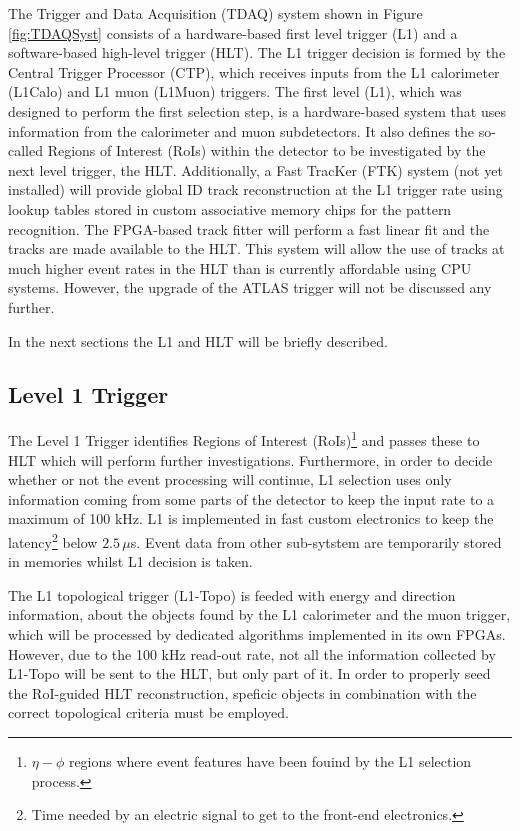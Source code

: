 		The Trigger and Data Acquisition (TDAQ) system shown in Figure \ref{fig:TDAQSyst} consists of a hardware-based first level trigger (L1) and a software-based high-level trigger (HLT). The L1 trigger decision is formed by the Central Trigger Processor (CTP), which receives inputs from the L1 calorimeter (L1Calo) and L1 muon (L1Muon) triggers. The first level (L1), which was designed to perform the first selection step, is a hardware-based system that uses information from the calorimeter and muon subdetectors. It also defines the so-called Regions of Interest (RoIs) within the detector to be investigated by the next level trigger, the HLT. Additionally, a Fast TracKer (FTK) system \cite{FTKTDR} (not yet installed) will provide global ID track reconstruction at the L1 trigger rate using lookup tables stored in custom associative memory chips for the pattern recognition. The FPGA-based track fitter will perform a fast linear fit and the tracks are made available to the HLT. This system will allow the use of tracks at much higher event rates in the HLT than is currently affordable using CPU systems. However, the upgrade of the ATLAS trigger will not be discussed any further.

		In the next sections the L1 and HLT will be briefly described. 


		\subsection{Level 1 Trigger}

			The Level 1 Trigger identifies Regions of Interest (RoIs)\footnote{$\eta - \phi$ regions where event features have been fouind by the L1 selection process.} and passes these to HLT which will perform further investigations. Furthermore, in order to decide whether or not the event processing will continue, L1 selection uses only information coming from some parts of the detector to keep the input rate to a maximum of 100 kHz. L1 is implemented in fast custom electronics to keep the latency\footnote{Time needed by an electric signal to get to the front-end electronics.} below $2.5\, \mu$s. Event data from other sub-sytstem are temporarily stored in memories whilst L1 decision is taken. 

			The L1 topological trigger (L1-Topo) \cite{ATLASL1Topo} is feeded with energy and direction information, about the objects found by the L1 calorimeter and the muon trigger, which will be processed by dedicated algorithms implemented in its own FPGAs. However, due to the 100 kHz read-out rate, not all the information collected by L1-Topo will be sent to the HLT, but only part of it. In order to properly seed the RoI-guided HLT reconstruction, speficic objects in combination with the correct topological criteria must be employed.


